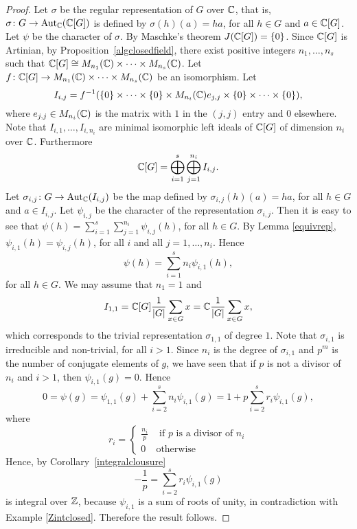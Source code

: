 \begin{proof}
    Let $\sigma$ be the regular representation of $G$ over $\mathbb{C}$, that is, $\sigma\colon G\rightarrow \operatorname{Aut}_{\mathbb{C}}(\mathbb{C}[G])$ is defined by
    $\sigma(h)(a)=ha$, for all $h\in G$ and $a\in\mathbb{C}[G]$.
    Let $\psi$ be the character of $\sigma$. By Maschke's theorem $J(\mathbb{C}[G])=\{0\}$. Since $\mathbb{C}[G]$ is Artinian, by Proposition~\ref{algclosedfield}, there exist positive integers $n_1,\dots,n_s$ such that $\mathbb{C}[G]\cong M_{n_1}(\mathbb{C})\times\dots\times M_{n_s}(\mathbb{C})$.
    Let $f\colon \mathbb{C}[G]\rightarrow M_{n_1}(\mathbb{C})\times\dots\times M_{n_s}(\mathbb{C})$ be an isomorphism. Let
    \[I_{i,j}=f^{-1}(\{0\}\times\dots\times\{0\}\times M_{n_i}(\mathbb{C})e_{j,j}\times\{0\}\times\dots\times\{0\}),\]
    where $e_{j,j}\in M_{n_i}(\mathbb{C})$ is the matrix with $1$ in the $(j,j)$ entry and $0$ elsewhere. Note that  $I_{i,1},\dots ,I_{i,n_i}$ are  minimal isomorphic left ideals of $\mathbb{C}[G]$ of dimension $n_i$ over $\mathbb{C}$. Furthermore
    \[\mathbb{C}[G]=\bigoplus_{i=1}^s\bigoplus_{j=1}^{n_i}I_{i,j}.\]
    Let $\sigma_{i,j}\colon G\rightarrow \operatorname{Aut}_{\mathbb{C}}(I_{i,j})$ be the map defined by
    $\sigma_{i,j}(h)(a)=ha$, for all $h\in G$ and $a\in I_{i,j}$. Let $\psi_{i,j}$ be the character of the representation $\sigma_{i,j}$. Then
    it is easy to see that $\psi(h)=\sum_{i=1}^s\sum_{j=1}^{n_i}\psi_{i,j}(h)$, for all $h\in G$. By Lemma \ref{equivrep}, $\psi_{i,1}(h)=\psi_{i,j}(h)$, for all $i$ and all $j=1,\dots ,n_i$. Hence
    \[\psi(h)=\sum_{i=1}^sn_i\psi_{i,1}(h),\]
    for all $h\in G$. We may assume that $n_1=1$ and 
    \[I_{1,1}=\mathbb{C}[G]\frac{1}{|G|}\sum_{x\in G}x=\mathbb{C}\frac{1}{|G|}\sum_{x\in G}x,\]
    which corresponds to the trivial representation $\sigma_{1,1}$ of degree $1$. Note that $\sigma_{i,1}$ is irreducible  and non-trivial, for all $i>1$. Since $n_i$ is the degree of $\sigma_{i,1}$ and $p^m$ is the number of conjugate elements of $g$, we have seen that if $p$ is not a divisor of $n_i$ and $i>1$, then  $\psi_{i,1}(g)=0$.
    Hence
    \[0=\psi(g)=\psi_{1,1}(g)+\sum_{i=2}^sn_i\psi_{i,1}(g)=1+p\sum_{i=2}^sr_i\psi_{i,1}(g),\]
    where 
    \[r_i=\left\{\begin{array}{ll}
    \frac{n_i}{p}&\mbox{ if $p$ is a divisor of $n_i$}\\
    0&\mbox{otherwise}\end{array}\right.\]
    Hence, by Corollary~\ref{integralclousure} 
    \[-\frac{1}{p}=\sum_{i=2}^sr_i\psi_{i,1}(g)\]
    is integral over $\mathbb{Z}$, because $\psi_{i,1}$ is a sum of roots of unity, in contradiction with Example \ref{Zintclosed}.
    Therefore the result follows.
\end{proof}

